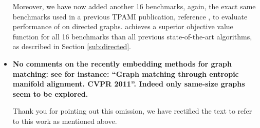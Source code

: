 \begin{itemize}

	Moreover, we have now added another 16 benchmarks, again, the exact same benchmarks used in a previous TPAMI publication, reference \cite{Liu2012}, to evaluate performance of \FAQ on directed graphs.   \FAQ achieves a superior objective value function for all 16 benchmarks than all previous state-of-the-art algorithms, as described in Section \ref{sub:directed}.


	\item \textbf{No comments on the recently embedding methods for graph matching: see for instance: ``Graph matching through entropic manifold alignment. CVPR 2011''.
Indeed only same-size graphs seem to be explored.}


Thank you for pointing out this omission, we have rectified the text to refer to this work as mentioned above.

\end{itemize}















% 